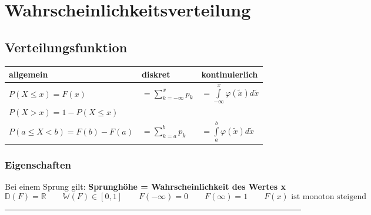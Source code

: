 \section{Wahrscheinlichkeitsverteilung}

	\subsection{Verteilungsfunktion \skript{\pageref{sk-chapter-wahrscheinlichkeitsverteilung}}}
		\begin{tabular}[]{|l|l|l|}
        	\hline
        	\textbf{allgemein} & \textbf{diskret} & \textbf{kontinuierlich}\\
        	\hline
        	\hline
        	$P(X\leq x)=F(x)$ & $=\sum\limits_{k=-\infty}^x p_k$ &
        	$=\int\limits_{-\infty}^x \varphi(\tilde{x})d\tilde{x}$\\
          
          $P(X>x)=1-P(X\leq x)$ & & \\        	
        	$P(a \le X < b)=F(b)-F(a)$ & $=\sum\limits_{k=a}^b p_k$ &
          $=\int \limits_a^b \varphi(\tilde{x})d\tilde{x}$\\
        	\hline
        \end{tabular}

		\subsubsection{Eigenschaften}
          Bei einem Sprung gilt: \textbf{Sprunghöhe = Wahrscheinlichkeit des Wertes x}\\
  				$$\boxed{\mathbb{D}(F) = \mathbb{R}} \qquad \boxed{\mathbb{W}(F)
  				\in[0,1]} \qquad \boxed{F(-\infty)=0} \qquad  \boxed{F(\infty)=1}
  				\qquad \boxed{F(x) \text{ ist monoton steigend}}$$

\hrule

